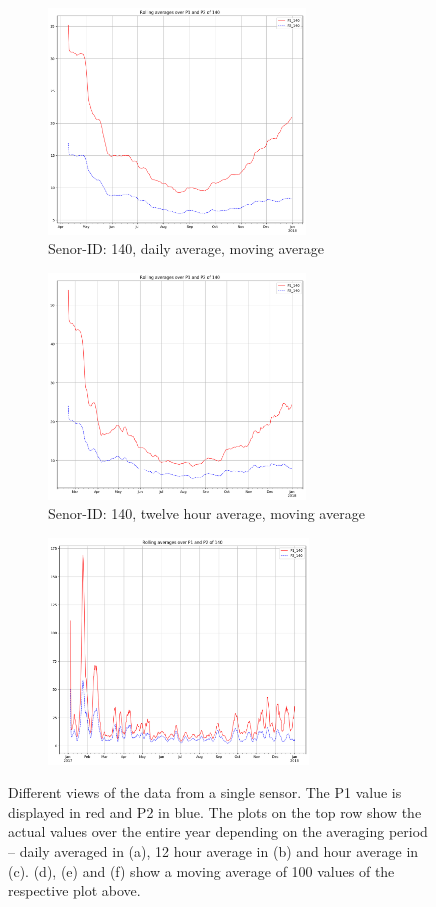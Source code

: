 \documentclass[12pt,a4paper,twoside]{scrartcl}
\numberwithin{equation}{section}
\begin{document}
\begin{figure}[H]
  \begin{subfigure}[t]{0.32\textwidth}
    \includegraphics[width=\textwidth,height=6cm]{figures/1D_140_rolling_plot_}%
    \caption{Senor-ID: 140, daily average, moving average}
  \end{subfigure}
  \begin{subfigure}[t]{0.32\textwidth}
    \includegraphics[width=\textwidth,height=6cm]{figures/12H_140_rolling_plot_}%
    \caption{Senor-ID: 140, twelve hour average, moving average}
  \end{subfigure}
  \begin{subfigure}[t]{0.32\textwidth}
    \includegraphics[width=\textwidth,height=6cm]{figures/1H_140_rolling_plot_}%
  \end{subfigure}      
  \caption[Sensor Data Plots]{Different views of the data from a single sensor. The P1 value is displayed in red and P2 in blue. The plots on the top row show the actual values over the entire year depending on the averaging period -- daily averaged in (a), 12 hour average in (b) and hour average in (c). (d), (e) and (f) show a moving average of 100 values of the respective plot above.}\label{fig:sensor-plots}
\end{figure}
\end{document}
